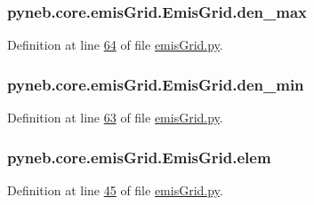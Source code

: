 \subsubsection[{den\+\_\+max}]{\setlength{\rightskip}{0pt plus 5cm}pyneb.\+core.\+emis\+Grid.\+Emis\+Grid.\+den\+\_\+max}\label{classpyneb_1_1core_1_1emis_grid_1_1_emis_grid_abd2b718af1e50d5c640e5fbb881c02f9}


Definition at line \hyperlink{emis_grid_8py_source_l00064}{64} of file \hyperlink{emis_grid_8py_source}{emis\+Grid.\+py}.

\hypertarget{classpyneb_1_1core_1_1emis_grid_1_1_emis_grid_a15ba80aa398cebb3178d75c8dd5a7e32}{}
\subsubsection[{den\+\_\+min}]{\setlength{\rightskip}{0pt plus 5cm}pyneb.\+core.\+emis\+Grid.\+Emis\+Grid.\+den\+\_\+min}\label{classpyneb_1_1core_1_1emis_grid_1_1_emis_grid_a15ba80aa398cebb3178d75c8dd5a7e32}


Definition at line \hyperlink{emis_grid_8py_source_l00063}{63} of file \hyperlink{emis_grid_8py_source}{emis\+Grid.\+py}.

\hypertarget{classpyneb_1_1core_1_1emis_grid_1_1_emis_grid_a860a236b0e426b4671071e4bf492dee7}{}
\subsubsection[{elem}]{\setlength{\rightskip}{0pt plus 5cm}pyneb.\+core.\+emis\+Grid.\+Emis\+Grid.\+elem}\label{classpyneb_1_1core_1_1emis_grid_1_1_emis_grid_a860a236b0e426b4671071e4bf492dee7}


Definition at line \hyperlink{emis_grid_8py_source_l00045}{45} of file \hyperlink{emis_grid_8py_source}{emis\+Grid.\+py}.



